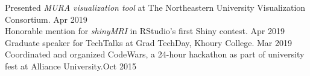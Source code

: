 \documentclass[a4paper]{article}
\newcommand{\mybullet}{
	\indent \textbullet \hspace*{2mm}
}
\begin{document}
    \mybullet Presented \textit{MURA visualization tool} at The Northeastern University 
    Visualization Consortium. \hfill Apr 2019 \\
    \mybullet Honorable mention for \textit{shinyMRI} in RStudio's first Shiny contest. 
    \hfill Apr 2019 \\
    \mybullet Graduate speaker for TechTalks at Grad TechDay, Khoury College. \hfill Mar 2019 \\
		\mybullet Coordinated and organized CodeWars, a 24-hour hackathon as part of 
		university fest at Alliance University.\hfill Oct 2015\\
		
\end{document}
